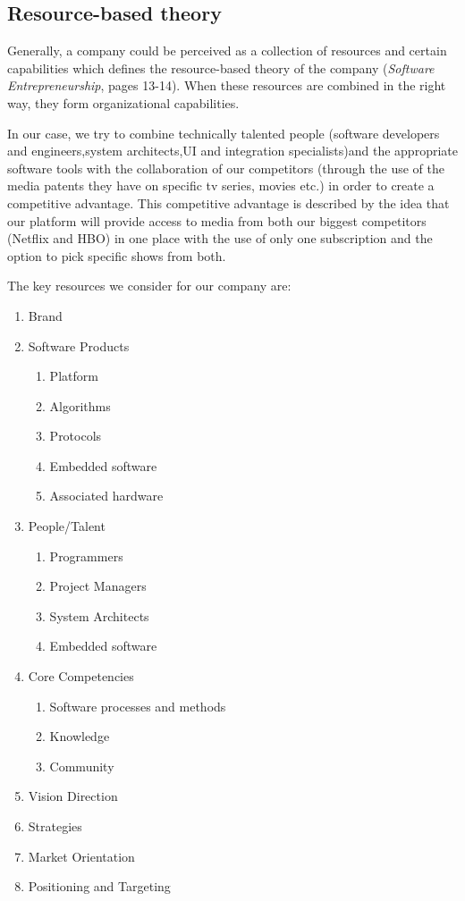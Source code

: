 \subsection{Resource-based theory}

Generally, a company could be perceived as a collection of resources and certain capabilities which defines the resource-based theory of the company (\textit{Software Entrepreneurship}, pages 13-14)\cite{Software_entrepreneurship}.
When these resources are combined in the right way, they form organizational capabilities.

In our case, we try to combine technically talented people (software developers and engineers,system architects,UI and integration specialists)and the appropriate software tools with the collaboration of our competitors (through the use of the media patents they have on specific tv series, movies etc.) in order to create a competitive advantage. This competitive advantage is described by the idea that our platform will provide access to media from both our biggest competitors (Netflix and HBO) in one place with the use of only one subscription and the option to pick specific shows from both.

The key resources we consider for our company are:

\begin{enumerate}
  \item Brand
  \item Software Products
  	\begin{enumerate}
   		\item Platform
   		\item Algorithms  	
    	\item Protocols
    	\item Embedded software
    	\item Associated hardware
  	\end{enumerate}
  \item People/Talent
  	\begin{enumerate}
      	\item Programmers
      	\item Project Managers
      	\item System Architects
      	\item Embedded software
    \end{enumerate}
  \item Core Competencies
  	\begin{enumerate}
        	\item Software processes and methods
        	\item Knowledge
        	\item Community
    \end{enumerate}
  \item Vision Direction
  \item Strategies
  \item Market Orientation
  \item Positioning and Targeting
\end{enumerate}

